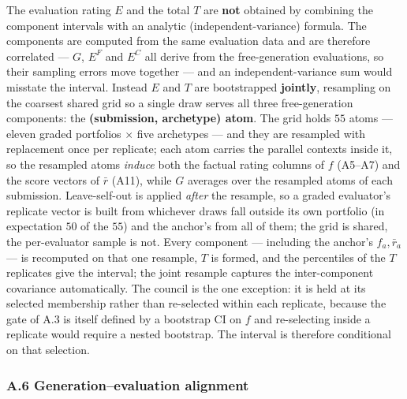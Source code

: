 The evaluation rating \(E\) and the total \(T\) are \textbf{not} obtained by combining the component intervals with an analytic (independent-variance) formula. The components are computed from the same evaluation data and are therefore correlated --- \(G\), \(E^{F}\) and \(E^{C}\) all derive from the free-generation evaluations, so their sampling errors move together --- and an independent-variance sum would misstate the interval. Instead \(E\) and \(T\) are bootstrapped \textbf{jointly}, resampling on the coarsest shared grid so a single draw serves all three free-generation components: the \textbf{(submission, archetype) atom}. The grid holds \(55\) atoms --- eleven graded portfolios \(\times\) five archetypes --- and they are resampled with replacement once per replicate; each atom carries the parallel contexts inside it, so the resampled atoms \emph{induce} both the factual rating columns of \(f\) (A5--A7) and the score vectors of \(\bar r\) (A11), while \(G\) averages over the resampled atoms of each submission. Leave-self-out is applied \emph{after} the resample, so a graded evaluator's replicate vector is built from whichever draws fall outside its own portfolio (in expectation \(50\) of the \(55\)) and the anchor's from all of them; the grid is shared, the per-evaluator sample is not. Every component --- including the anchor's \(f_a,\bar r_a\) --- is recomputed on that one resample, \(T\) is formed, and the percentiles of the \(T\) replicates give the interval; the joint resample captures the inter-component covariance automatically. The council is the one exception: it is held at its selected membership rather than re-selected within each replicate, because the gate of A.3 is itself defined by a bootstrap CI on \(f\) and re-selecting inside a replicate would require a nested bootstrap. The interval is therefore conditional on that selection.

\subsubsection{A.6 Generation--evaluation alignment}\label{a.6-generationevaluation-alignment}

